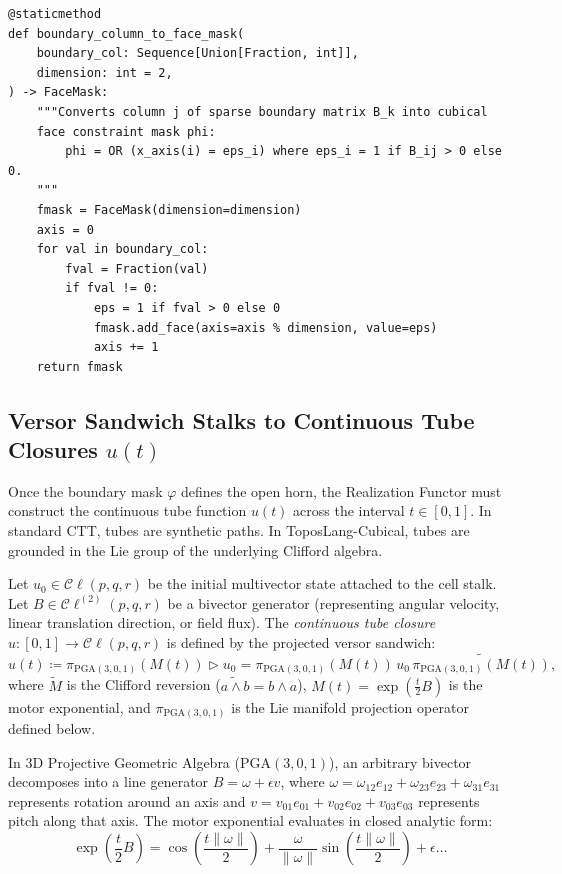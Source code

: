 \documentclass[acmsmall,screen,nonacm]{acmart}
\newcommand{\Cl}{\mathcal{C}\ell}
\newcommand{\PGA}{\mathrm{PGA}(3,0,1)}
\begin{document}
\begin{lstlisting}[style=pycode,caption={Compilation of boundary column into cubical FaceMask in \texttt{bridge.py}.},label=lst:python-bitmask]
@staticmethod
def boundary_column_to_face_mask(
    boundary_col: Sequence[Union[Fraction, int]],
    dimension: int = 2,
) -> FaceMask:
    """Converts column j of sparse boundary matrix B_k into cubical 
    face constraint mask phi:
        phi = OR (x_axis(i) = eps_i) where eps_i = 1 if B_ij > 0 else 0.
    """
    fmask = FaceMask(dimension=dimension)
    axis = 0
    for val in boundary_col:
        fval = Fraction(val)
        if fval != 0:
            eps = 1 if fval > 0 else 0
            fmask.add_face(axis=axis % dimension, value=eps)
            axis += 1
    return fmask
\end{lstlisting}

\subsection{Versor Sandwich Stalks to Continuous Tube Closures \texorpdfstring{$u(t)$}{u(t)}}
\label{sec:tube-closure}

Once the boundary mask $\varphi$ defines the open horn, the Realization Functor must construct the continuous tube function $u(t)$ across the interval $t \in [0, 1]$. In standard CTT, tubes are synthetic paths. In ToposLang-Cubical, tubes are grounded in the Lie group of the underlying Clifford algebra.

\begin{definition}
\label{def:motor-closure}
Let $u_0 \in \Cl(p,q,r)$ be the initial multivector state attached to the cell stalk. Let $B \in \Cl^{(2)}(p,q,r)$ be a bivector generator (representing angular velocity, linear translation direction, or field flux). The \emph{continuous tube closure} $u : [0, 1] \to \Cl(p,q,r)$ is defined by the projected versor sandwich:
\[
  u(t) \coloneqq \pi_{\PGA}\left( M(t) \right) \triangleright u_0 = \pi_{\PGA}\left( M(t) \right)\, u_0\, \widetilde{\pi_{\PGA}\left( M(t) \right)},
\]
where $\widetilde{M}$ is the Clifford reversion ($\widetilde{a \wedge b} = b \wedge a$), $M(t) = \exp(\frac{t}{2}B)$ is the motor exponential, and $\pi_{\PGA}$ is the Lie manifold projection operator defined below.
\end{definition}

In 3D Projective Geometric Algebra ($\PGA$), an arbitrary bivector decomposes into a line generator $B = \omega + \epsilon v$, where $\omega = \omega_{12} e_{12} + \omega_{23} e_{23} + \omega_{31} e_{31}$ represents rotation around an axis and $v = v_{01} e_{01} + v_{02} e_{02} + v_{03} e_{03}$ represents pitch along that axis. The motor exponential evaluates in closed analytic form:
\[
  \exp\left(\frac{t}{2} B\right) = \cos\left(\frac{t \|\omega\|}{2}\right) + \frac{\omega}{\|\omega\|} \sin\left(\frac{t \|\omega\|}{2}\right) + \epsilon \dots
\]
\end{document}
